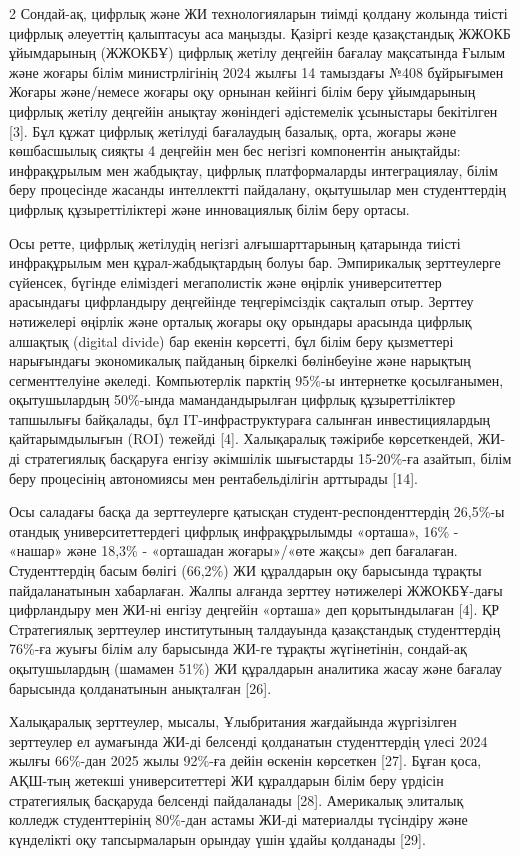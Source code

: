 \begin{multicols}{2}
Сондай-ақ, цифрлық және ЖИ технологияларын тиімді қолдану жолында тиісті
цифрлық әлеуеттің қалыптасуы аса маңызды. Қазіргі кезде қазақстандық
ЖЖОКБ ұйымдарының (ЖЖОКБҰ) цифрлық жетілу деңгейін бағалау мақсатында
Ғылым және жоғары білім министрлігінің 2024 жылғы 14 тамыздағы №408
бұйрығымен Жоғары және/немесе жоғары оқу орнынан кейінгі білім беру
ұйымдарының цифрлық жетілу деңгейін анықтау жөніндегі әдістемелік
ұсыныстары бекітілген {[}3{]}. Бұл құжат цифрлық жетілуді бағалаудың
базалық, орта, жоғары және көшбасшылық сияқты 4 деңгейін мен бес негізгі
компонентін анықтайды: инфрақұрылым мен жабдықтау, цифрлық
платформаларды интеграциялау, білім беру процесінде жасанды интеллектті
пайдалану, оқытушылар мен студенттердің цифрлық құзыреттіліктері және
инновациялық білім беру ортасы.

Осы ретте, цифрлық жетілудің негізгі алғышарттарының қатарында тиісті
инфрақұрылым мен құрал-жабдықтардың болуы бар. Эмпирикалық зерттеулерге
сүйенсек, бүгінде еліміздегі мегаполистік және өңірлік университеттер
арасындағы цифрландыру деңгейінде теңгерімсіздік сақталып отыр. Зерттеу
нәтижелері өңірлік және орталық жоғары оқу орындары арасында цифрлық
алшақтық (digital divide) бар екенін көрсетті, бұл білім беру қызметтері
нарығындағы экономикалық пайданың біркелкі бөлінбеуіне және нарықтың
сегменттелуіне әкеледі. Компьютерлік парктің 95\%-ы интернетке
қосылғанымен, оқытушылардың 50\%-ында мамандандырылған цифрлық
құзыреттіліктер тапшылығы байқалады, бұл IT-инфраструктураға салынған
инвестициялардың қайтарымдылығын (ROI) тежейді {[}4{]}. Халықаралық
тәжірибе көрсеткендей, ЖИ-ді стратегиялық басқаруға енгізу әкімшілік
шығыстарды 15-20\%-ға азайтып, білім беру процесінің автономиясы мен
рентабельділігін арттырады {[}14{]}.

Осы саладағы басқа да зерттеулерге қатысқан студент-респонденттердің
26,5\%-ы отандық университеттердегі цифрлық инфрақұрылымды «орташа»,
16\% - «нашар» және 18,3\% - «орташадан жоғары»/«өте жақсы» деп
бағалаған. Студенттердің басым бөлігі (66,2\%) ЖИ құралдарын оқу
барысында тұрақты пайдаланатынын хабарлаған. Жалпы алғанда зерттеу
нәтижелері ЖЖОКБҰ-дағы цифрландыру мен ЖИ-ні енгізу деңгейін «орташа»
деп қорытындылаған {[}4{]}. ҚР Стратегиялық зерттеулер институтының
талдауында қазақстандық студенттердің 76\%-ға жуығы білім алу барысында
ЖИ-ге тұрақты жүгінетінін, сондай-ақ оқытушылардың (шамамен 51\%) ЖИ
құралдарын аналитика жасау және бағалау барысында қолданатынын
анықталған {[}26{]}.

Халықаралық зерттеулер, мысалы, Ұлыбритания жағдайында жүргізілген
зерттеулер ел аумағында ЖИ-ді белсенді қолданатын студенттердің үлесі
2024 жылғы 66\%-дан 2025 жылы 92\%-ға дейін өскенін көрсеткен {[}27{]}.
Бұған қоса, АҚШ-тың жетекші университеттері ЖИ құралдарын білім беру
үрдісін стратегиялық басқаруда белсенді пайдаланады {[}28{]}. Америкалық
элиталық колледж студенттерінің 80\%-дан астамы ЖИ-ді материалды
түсіндіру және күнделікті оқу тапсырмаларын орындау үшін ұдайы қолданады
{[}29{]}.


\end{multicols}
